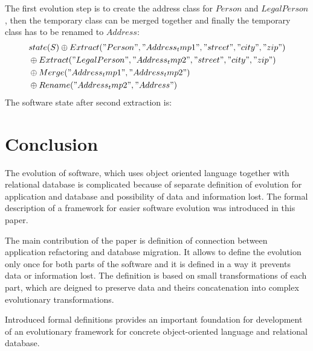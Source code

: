 \documentclass[11pt]{article}
\begin{document}
The first evolution step is to create the address class for $Person$ and $LegalPerson$, then the temporary class can be merged together and finally the temporary class has to be renamed to $Address$:
\begin{align*}
& state(S) \oplus Extract("Person", "Address_tmp1", "street", "city", "zip") \\
& \oplus Extract("LegalPerson", "Address_tmp2", "street", "city", "zip")  \\
& \oplus Merge("Address_tmp1", "Address_tmp2") \\
& \oplus Rename("Address_tmp2", "Address")
\end{align*}
The software state after second extraction is:








  
 
\section{Conclusion}
The evolution of software, which uses object oriented language together with relational database is complicated because of separate definition of evolution for application and database and possibility of data and information lost. The formal description of a framework for easier software evolution was introduced in this paper. 

The main contribution of the paper is definition of connection between application refactoring and database migration. It allows to define the evolution only once for both parts of the software and it is defined in a way it prevents data or information lost. The definition is based on small transformations of each part, which are deigned to preserve data and theirs concatenation into complex evolutionary transformations.

Introduced formal definitions provides an important foundation for development of an evolutionary framework for concrete object-oriented language and relational database.

\newpage
\appendix
\end{document}
